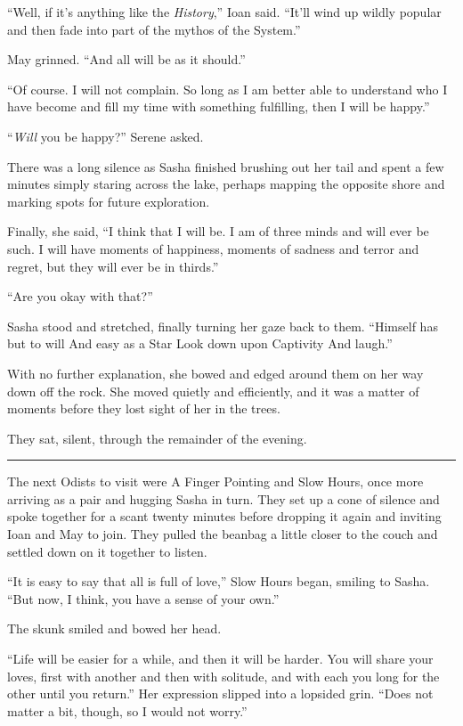 ``Well, if it's anything like the \emph{History},'' Ioan said. ``It'll wind up wildly popular and then fade into part of the mythos of the System.''

May grinned. ``And all will be as it should.''

``Of course. I will not complain. So long as I am better able to understand who I have become and fill my time with something fulfilling, then I will be happy.''

``\emph{Will} you be happy?'' Serene asked.

There was a long silence as Sasha finished brushing out her tail and spent a few minutes simply staring across the lake, perhaps mapping the opposite shore and marking spots for future exploration.

Finally, she said, ``I think that I will be. I am of three minds and will ever be such. I will have moments of happiness, moments of sadness and terror and regret, but they will ever be in thirds.''

``Are you okay with that?''

Sasha stood and stretched, finally turning her gaze back to them. ``Himself has but to will And easy as a Star Look down upon Captivity And laugh.''

With no further explanation, she bowed and edged around them on her way down off the rock. She moved quietly and efficiently, and it was a matter of moments before they lost sight of her in the trees.

They sat, silent, through the remainder of the evening.

\begin{center}\rule{0.5\linewidth}{0.5pt}\end{center}

The next Odists to visit were A Finger Pointing and Slow Hours, once more arriving as a pair and hugging Sasha in turn. They set up a cone of silence and spoke together for a scant twenty minutes before dropping it again and inviting Ioan and May to join. They pulled the beanbag a little closer to the couch and settled down on it together to listen.

``It is easy to say that all is full of love,'' Slow Hours began, smiling to Sasha. ``But now, I think, you have a sense of your own.''

The skunk smiled and bowed her head.

``Life will be easier for a while, and then it will be harder. You will share your loves, first with another and then with solitude, and with each you long for the other until you return.'' Her expression slipped into a lopsided grin. ``Does not matter a bit, though, so I would not worry.''

